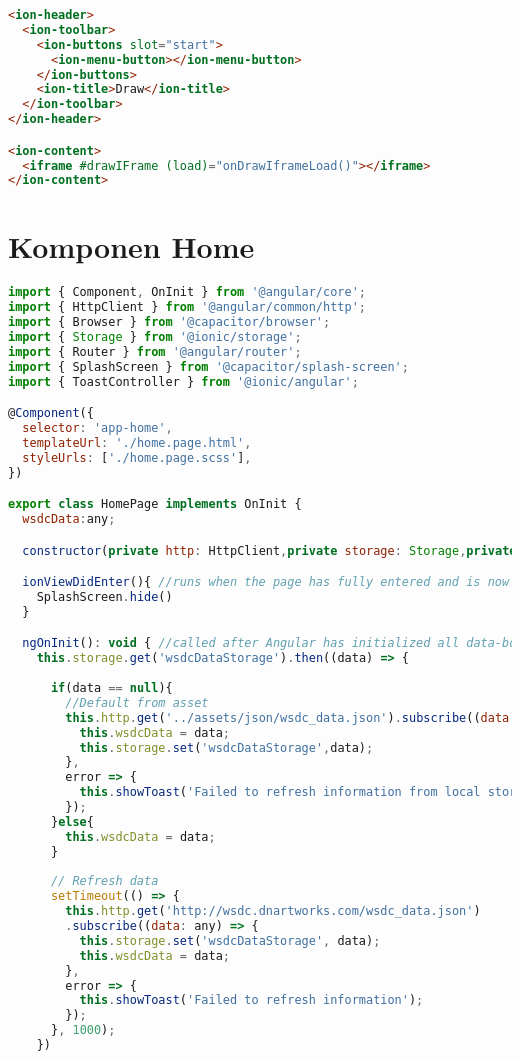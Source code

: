 \begin{lstlisting}[language=html, label={lst:draw.page.html}, caption=draw.page.html]
<ion-header>
  <ion-toolbar>
    <ion-buttons slot="start">
      <ion-menu-button></ion-menu-button>
    </ion-buttons>
    <ion-title>Draw</ion-title>
  </ion-toolbar>
</ion-header>

<ion-content>
  <iframe #drawIFrame (load)="onDrawIframeLoad()"></iframe>
</ion-content>
\end{lstlisting} 

\newpage

\section{Komponen Home} 
\label{sec:lampiranKomponenHome}

\begin{lstlisting}[language=JavaScript, label={lst:home.page.ts}, caption=home.page.ts]
import { Component, OnInit } from '@angular/core';
import { HttpClient } from '@angular/common/http';
import { Browser } from '@capacitor/browser';
import { Storage } from '@ionic/storage';
import { Router } from '@angular/router';
import { SplashScreen } from '@capacitor/splash-screen';
import { ToastController } from '@ionic/angular';

@Component({
  selector: 'app-home',
  templateUrl: './home.page.html',
  styleUrls: ['./home.page.scss'],
})

export class HomePage implements OnInit {
  wsdcData:any;

  constructor(private http: HttpClient,private storage: Storage,private router: Router,public toastController: ToastController) { }

  ionViewDidEnter(){ //runs when the page has fully entered and is now the active page.
    SplashScreen.hide()
  }

  ngOnInit(): void { //called after Angular has initialized all data-bound properties of a directive
    this.storage.get('wsdcDataStorage').then((data) => {
      
      if(data == null){
        //Default from asset
        this.http.get('../assets/json/wsdc_data.json').subscribe((data: any) => {
          this.wsdcData = data;
          this.storage.set('wsdcDataStorage',data);       
        },
        error => {
          this.showToast('Failed to refresh information from local storage');
        });
      }else{    
        this.wsdcData = data;
      }
      
      // Refresh data
      setTimeout(() => {
        this.http.get('http://wsdc.dnartworks.com/wsdc_data.json')
        .subscribe((data: any) => {
          this.storage.set('wsdcDataStorage', data);
          this.wsdcData = data;
        },
        error => {
          this.showToast('Failed to refresh information');
        });
      }, 1000);
    })
    

\end{lstlisting}
